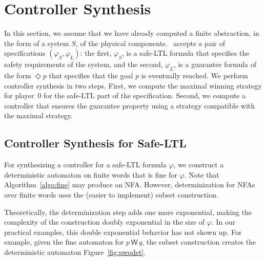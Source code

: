 \section{Controller Synthesis}


In this section, we assume that we have already computed a finite
abstraction, 
in the form of a system $S$, of the physical components.
\tool~accepts a pair of specifications $(\varphi_S,\varphi_L)$: the
first, $\varphi_S$, is a safe-LTL
formula that specifies the safety requirements of the system, and
the second, $\varphi_L$, is a guarantee formula of the form $\Diamond p$ that
specifies that the goal $p$ is eventually reached.
We perform controller synthesis in two steps.
First, we compute the maximal winning strategy for player~0 for the
safe-LTL part of the specification.
Second, we compute a controller that ensures the guarantee property
using a strategy compatible with the maximal strategy.

\subsection{Controller Synthesis for Safe-LTL}

For synthesizing a controller for a safe-LTL formula $\varphi$, we construct a
deterministic automaton on finite words that is fine for $\varphi$.
Note that Algorithm~\ref{algo:fine} may produce an NFA.
However, determinization for NFAs over finite words uses the (easier
to implement) subset construction.



Theoretically, the determinization step adds one more exponential,
making the complexity of the construction doubly exponential in the
size of $\varphi$.
In our practical examples, this double exponential behavior has not
shown up.
For example, given the fine automaton for $p\, \mathsf{W}\, q$, the subset construction
creates the deterministic automaton Figure~\ref{fig:pwqdet}.

